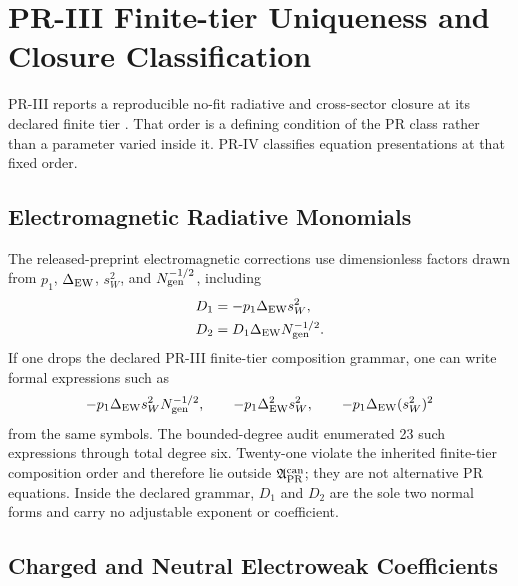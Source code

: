 \section{PR-III Finite-tier Uniqueness and Closure Classification}
\label{sec:pr3-branch-countermodels}

PR-III reports a reproducible no-fit radiative and cross-sector closure at its declared finite tier \cite{PRIII}.  That order is a defining condition of the PR class rather than a parameter varied inside it.  PR-IV classifies equation presentations at that fixed order.

\subsection{Electromagnetic Radiative Monomials}

The released-preprint electromagnetic corrections use dimensionless factors drawn from $p_1$, $\Delta_{\rm EW}$, $s_W^2$, and $N_{\rm gen}^{-1/2}$, including \begin{align}
 D_1&=-p_1\Delta_{\rm EW}s_W^2,\\
 D_2&=D_1\Delta_{\rm EW}N_{\rm gen}^{-1/2}.
\end{align}
If one drops the declared PR-III finite-tier composition grammar, one can write formal expressions such as
\begin{equation}
 -p_1\Delta_{\rm EW}s_W^2N_{\rm gen}^{-1/2},
 \qquad
 -p_1\Delta_{\rm EW}^2s_W^2,
 \qquad
 -p_1\Delta_{\rm EW}(s_W^2)^2
 \label{eq:pr35-pr3-monomial-counterexamples}
\end{equation}
from the same symbols.  The bounded-degree audit enumerated 23 such expressions through total degree six.  Twenty-one violate the inherited finite-tier composition order and therefore lie outside $\mathfrak A_{\rm PR}^{\rm can}$; they are not alternative PR equations. Inside the declared grammar, $D_1$ and $D_2$ are the sole two normal forms and carry no adjustable exponent or coefficient.

\subsection{Charged and Neutral Electroweak Coefficients}

